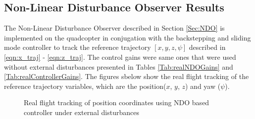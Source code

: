 \documentclass[letterpaper%
, twoside%
, 12pt%
,memoire%
, english%
,creativecommons,hyperref%
]{thETS}
\theoremstyle{newThmStyle}
\begin{document}
\subsection{Non-Linear Disturbance Observer Results}
The Non-Linear Disturbance Observer described in Section \ref{Sec:NDO} is implemented on the quadcopter in conjugation with the backstepping and sliding mode controller to track the reference trajectory $[x,y,z,\psi]$ described in \eqref{eqn:x_traj} - \eqref{eqn:z_traj}. The control gains were same ones that were used without external disturbances  presented in Tables \ref{Tab:realNDOGains} and \ref{Tab:realControllerGains}. The figures sbelow show the real flight tracking of the reference trajectory variables, which are the position($x$, $y$, $z$) and yaw ($\psi$). 
\begin{figure}[H]
	\centering
	\parbox{0.75\textwidth}{\caption{Real flight tracking of position coordinates using NDO based controller under external disturbances\label{Fig:xyztracNDODist}}}
\end{figure}
\end{document}

